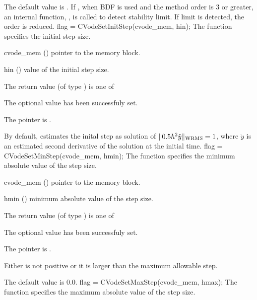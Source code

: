 {
  The default value is . If , when BDF is used
  and the method order is 3 or greater, an internal function, ,
  is called to detect stability limit. If limit is detected, the order is reduced.
}
{
flag = CVodeSetInitStep(cvode\_mem, hin);
}
{
  The function  specifies the initial step size.
}
{
  \begin{args}
  \item[cvode\_mem] ()
    pointer to the {\cvode} memory block.
  \item[hin] ()
    value of the initial step size.
  \end{args}
}
{
  The return value  (of type ) is one of
  \begin{args}
  \item[\Id{SUCCESS}] 
    The optional value has been successfuly set.
  \item[\Id{CVS\_NO\_MEM}]
    The  pointer is .
  \end{args}
}
{
  By default, {\cvode} estimates the inital step as solution of 
  $\| 0.5 h^2 \ddot y \|_{\mbox{\scriptsize WRMS}} = 1$,
  where $\ddot y$ is an estimated second derivative of the solution at the
  initial time.
}
{
flag = CVodeSetMinStep(cvode\_mem, hmin);
}
{
  The function  specifies the minimum absolute
  value of the step size.
}
{
  \begin{args}
  \item[cvode\_mem] ()
    pointer to the {\cvode} memory block.
  \item[hmin] ()
    minimum absolute value of the step size.
  \end{args}
}
{
  The return value  (of type ) is one of
  \begin{args}
  \item[\Id{SUCCESS}] 
    The optional value has been successfuly set.
  \item[\Id{CVS\_NO\_MEM}]
    The  pointer is .
  \item[\Id{CVS\_ILL\_INPUT}]
    Either  is not positive or it is larger than the maximum allowable step.
  \end{args}
}
{
  The default value is $0.0$.
}
{
flag = CVodeSetMaxStep(cvode\_mem, hmax);
}
{
  The function  specifies the maximum absolute
  value of the step size.
}
